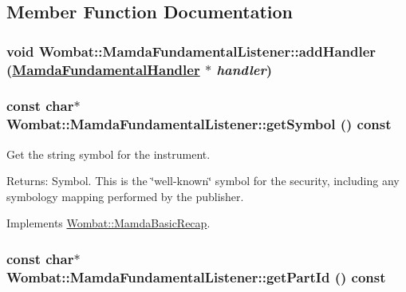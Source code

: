 \subsection{Member Function Documentation}
\hypertarget{classWombat_1_1MamdaFundamentalListener_6b29c6f9655c0cfce28fe49e658db2a9}{
\subsubsection[addHandler]{\setlength{\rightskip}{0pt plus 5cm}void Wombat::Mamda\-Fundamental\-Listener::add\-Handler (\hyperlink{classWombat_1_1MamdaFundamentalHandler}{Mamda\-Fundamental\-Handler} $\ast$ {\em handler})}}
\label{classWombat_1_1MamdaFundamentalListener_6b29c6f9655c0cfce28fe49e658db2a9}


\hypertarget{classWombat_1_1MamdaFundamentalListener_0d2fdebba24d7951873278facc446865}{
\subsubsection[getSymbol]{\setlength{\rightskip}{0pt plus 5cm}const char$\ast$ Wombat::Mamda\-Fundamental\-Listener::get\-Symbol () const}}
\label{classWombat_1_1MamdaFundamentalListener_0d2fdebba24d7951873278facc446865}


Get the string symbol for the instrument. 

\begin{Desc}
\item[Returns:]Symbol. This is the \char`\"{}well-known\char`\"{} symbol for the security, including any symbology mapping performed by the publisher. \end{Desc}


Implements \hyperlink{classWombat_1_1MamdaBasicRecap_79784f420fdf399a3716a9919ab592e8}{Wombat::Mamda\-Basic\-Recap}.\hypertarget{classWombat_1_1MamdaFundamentalListener_9902a2a7113039defa7114cbf2c88250}{
\subsubsection[getPartId]{\setlength{\rightskip}{0pt plus 5cm}const char$\ast$ Wombat::Mamda\-Fundamental\-Listener::get\-Part\-Id () const}}
\label{classWombat_1_1MamdaFundamentalListener_9902a2a7113039defa7114cbf2c88250}


